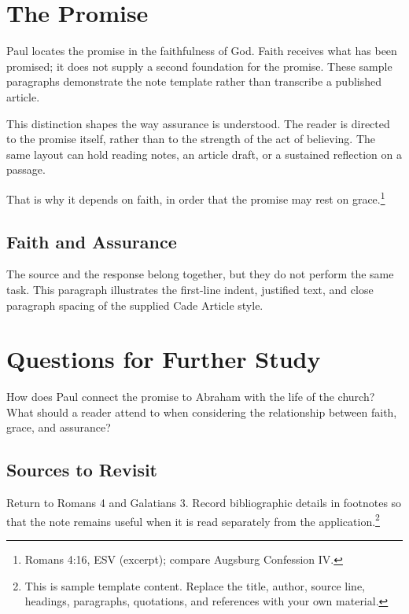 \documentclass[11pt]{article}
\begin{document}
\noteopening

\section{The Promise}
Paul locates the promise in the faithfulness of God. Faith receives what has been promised; it does not supply a second foundation for the promise. These sample paragraphs demonstrate the note template rather than transcribe a published article.

This distinction shapes the way assurance is understood. The reader is directed to the promise itself, rather than to the strength of the act of believing. The same layout can hold reading notes, an article draft, or a sustained reflection on a passage.

\begin{bquote}
That is why it depends on faith, in order that the promise may rest on grace.\footnote{Romans 4:16, ESV (excerpt); compare Augsburg Confession IV.}
\end{bquote}

\subsection{Faith and Assurance}
The source and the response belong together, but they do not perform the same task. This paragraph illustrates the first-line indent, justified text, and close paragraph spacing of the supplied Cade Article style.

\section{Questions for Further Study}
How does Paul connect the promise to Abraham with the life of the church? What should a reader attend to when considering the relationship between faith, grace, and assurance?

\subsection{Sources to Revisit}
Return to Romans 4 and Galatians 3. Record bibliographic details in footnotes so that the note remains useful when it is read separately from the application.\footnote{This is sample template content. Replace the title, author, source line, headings, paragraphs, quotations, and references with your own material.}
\end{document}
